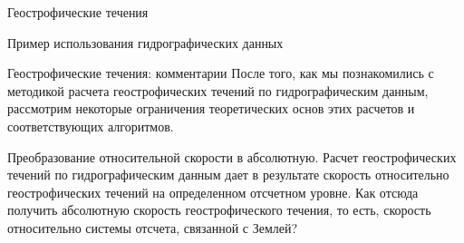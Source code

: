 \begin{chapter}{Геострофические течения}
\begin{section}{Пример использования гидрографических данных}
\end{section}

\begin{section}{Геострофические течения: комментарии}
После того, как мы познакомились с методикой расчета
геострофических течений 
по гидрографическим 
данным, 
рассмотрим некоторые ограничения теоретических основ этих расчетов и
соответствующих алгоритмов.
%

\begin{paragraph}{Преобразование относительной скорости в абсолютную. }
Расчет геострофических течений по гидрографическим данным дает в результате
скорость относительно
геострофических течений на определенном отсчетном уровне. 
Как отсюда получить абсолютную скорость геострофического течения, то есть,
скорость относительно системы отсчета, связанной с Землей?
%


\end{paragraph}
\end{section}
\end{chapter}
